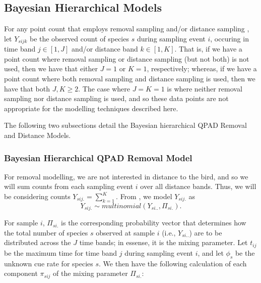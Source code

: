 \documentclass[12pt]{article}
\begin{document}
\subsection{Bayesian Hierarchical Models}

\par For any point count that employs removal sampling \citep{alldredge_time--detection_2007, farnsworth_removal_2002} and/or distance sampling \citep{buckland_introduction_2001, buckland_distance_2015}, let $Y_{sijk}$ be the observed count of species $s$ during sampling event $i$, occuring in time band $j \in [1,J]$ and/or distance band $k \in [1,K]$.
That is, if we have a point count where removal sampling or distance sampling (but not both) is not used, then we have that either $J = 1$ or $K = 1$, respectively; whereas, if we have a point count where both removal sampling and distance sampling is used, then we have that both $J,K \geq 2$.
The case where $J = K = 1$ is where neither removal sampling nor distance sampling is used, and so these data points are not appropriate for the modelling techniques described here.

\par The following two subsections detail the Bayesian hierarchical QPAD Removal and Distance Models.

\subsubsection{Bayesian Hierarchical QPAD Removal Model}

\par For removal modelling, we are not interested in distance to the bird, and so we will sum counts from each sampling event $i$ over all distance bands. 
Thus, we will be considering counts $Y_{sij.} = \sum_{k=1}^{K}$. 
From \citet{solymos_calibrating_2013}, we model $Y_{sij.}$ as
$$Y_{sij.} \sim multinomial\left(Y_{si..}, \Pi_{si.}\right).$$

\par For sample $i$, $\Pi_{si.}$ is the corresponding probability vector that determines how the total number of species $s$ observed at sample $i$ (i.e., $Y_{si..}$) are to be distributed across the $J$ time bands; in essense, it is the mixing parameter.
Let $t_{ij}$ be the maximum time for time band $j$ during sampling event $i$, and let $\phi_s$ be the unknown cue rate for species $s$.
We then have the following calculation of each component $\pi_{sij}$ of the mixing parameter $\Pi_{si.}$:
\end{document}
